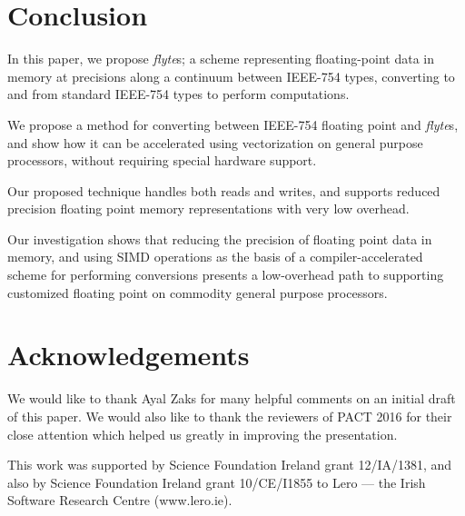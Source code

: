 \documentclass{sig-alternate-05-2015}
\begin{document}
\section{Conclusion}
\label{sec:conclusion}

In this paper, we propose \textit{flyte}s; a scheme representing floating-point
data in memory at precisions along a continuum between IEEE-754 types,
converting to and from standard IEEE-754 types to perform computations.

We propose a method for converting between IEEE-754 floating point and
\textit{flyte}s, and show how it can be accelerated using vectorization on
general purpose processors, without requiring special hardware support.

Our proposed technique handles both reads and writes, and supports reduced
precision floating point memory representations with very low overhead.

Our investigation shows that reducing the precision of floating point data in
memory, and using SIMD operations as the basis of a compiler-accelerated scheme
for performing conversions presents a low-overhead path to supporting
customized floating point on commodity general purpose processors.



\section*{Acknowledgements}

We would like to thank Ayal Zaks for many helpful comments on an initial draft
of this paper. We would also like to thank the reviewers of PACT 2016 for their
close attention which helped us greatly in improving the presentation.

This work was supported by Science Foundation Ireland grant 12/IA/1381, and
also by Science Foundation Ireland grant 10/CE/I1855 to Lero --- the Irish
Software Research Centre (www.lero.ie).

\eject


\end{document}
